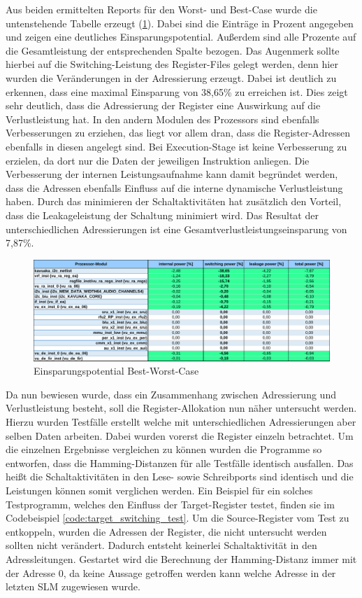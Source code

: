 Aus beiden ermittelten Reports für den Worst- und Best-Case wurde die untenstehende Tabelle erzeugt (\ref{fig:best_powersave}). Dabei sind die Einträge in Prozent angegeben und zeigen eine deutliches Einsparungspotential. Außerdem sind alle Prozente auf die Gesamtleistung der entsprechenden Spalte bezogen. Das Augenmerk sollte hierbei auf die Switching-Leistung des Register-Files gelegt werden, denn hier wurden die Veränderungen in der Adressierung erzeugt. Dabei ist deutlich zu erkennen, dass eine maximal Einsparung von 38,65\% zu erreichen ist. Dies zeigt sehr deutlich, dass die Adressierung der Register eine Auswirkung auf die Verlustleistung hat. In den andern Modulen des Prozessors sind ebenfalls Verbesserungen zu erziehen, das liegt vor allem dran, dass die Register-Adressen ebenfalls in diesen angelegt sind. Bei Execution-Stage ist keine Verbesserung zu erzielen, da dort nur die Daten der jeweiligen Instruktion anliegen. Die Verbesserung der internen Leistungsaufnahme kann damit begründet werden, dass die Adressen ebenfalls Einfluss auf die interne dynamische Verlustleistung haben.
Durch das minimieren der Schaltaktivitäten hat zusätzlich den Vorteil, dass die Leakageleistung der Schaltung minimiert wird. Das Resultat der unterschiedlichen Adressierungen ist eine Gesamtverlustleistungseinsparung von 7,87\%.

\begin{figure}[H] 
	\centering
	\includegraphics[width=\textwidth]{fig/best_worst_compare.pdf}
	\caption{Einsparungspotential Best-Worst-Case}
	\label{fig:best_powersave}
\end{figure}

Da nun bewiesen wurde, dass ein Zusammenhang zwischen Adressierung und Verlustleistung besteht, soll die Register-Allokation nun näher untersucht werden. Hierzu wurden Testfälle erstellt welche mit unterschiedlichen Adressierungen aber selben Daten arbeiten. Dabei wurden vorerst die Register einzeln betrachtet. Um die einzelnen Ergebnisse vergleichen zu können wurden die Programme so entworfen, dass die Hamming-Distanzen für alle Testfälle identisch ausfallen. Das heißt die Schaltaktivitäten in den Lese- sowie Schreibports sind identisch und die Leistungen können somit verglichen werden. Ein Beispiel für ein solches Testprogramm, welches den Einfluss der Target-Register testet, finden sie im Codebeispiel \ref{code:target_switching_test}. Um die Source-Register vom Test zu entkoppeln, wurden die Adressen der Register, die nicht untersucht werden sollten nicht verändert. Dadurch entsteht keinerlei Schaltaktivität in den Adressleitungen. Gestartet wird die Berechnung der Hamming-Distanz immer mit der Adresse 0, da keine Aussage getroffen werden kann welche Adresse in der letzten SLM zugewiesen wurde.

